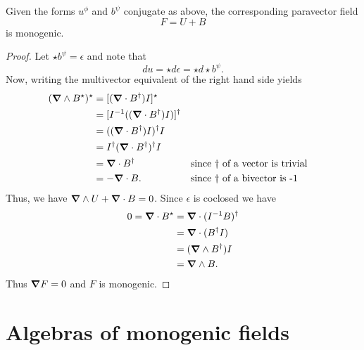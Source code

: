 \documentclass[12pt]{article}
\begin{document}
\begin{lemma}
Given the forms $u^\phi$ and $b^\psi$ conjugate as above, the corresponding paravector field
\[
F = U + B
\]
is monogenic.
\end{lemma}
\begin{proof}
Let $\star b^\psi = \epsilon$ and note that 
\[
d u = \star d \epsilon = \star d \star b^\psi.  
\]
Now, writing the multivector equivalent of the right hand side yields
\begin{align*}
(\boldsymbol{\nabla} \wedge B^\star )^\star &= [(\boldsymbol{\nabla} \cdot B^\dagger) I]^\star\\
    &= [I^{-1} ((\boldsymbol{\nabla} \cdot B^\dagger) I)]^\dagger\\
    &= ((\boldsymbol{\nabla} \cdot B^\dagger)I)^\dagger I\\
    &= I^\dagger (\boldsymbol{\nabla} \cdot B^\dagger)^\dagger I\\
    &= \boldsymbol{\nabla} \cdot B^\dagger && \textrm{since $\dagger$ of a vector is trivial}\\
    &= -\boldsymbol{\nabla} \cdot B. && \textrm{since $\dagger$ of a bivector is -1}
\end{align*}
Thus, we have $\boldsymbol{\nabla} \wedge U + \boldsymbol{\nabla} \cdot B = 0$. Since $\epsilon$ is coclosed we have
\begin{align*}
0=\boldsymbol{\nabla} \cdot B^\star &= \boldsymbol{\nabla} \cdot (I^{-1} B)^\dagger \\
    &= \boldsymbol{\nabla} \cdot (B^\dagger I)\\
    &= (\boldsymbol{\nabla} \wedge B^\dagger) I\\
    &= \boldsymbol{\nabla} \wedge B.
\end{align*}
Thus $\boldsymbol{\nabla} F =0$ and $F$ is monogenic.
\end{proof}



\section{Algebras of monogenic fields}

\end{document}
